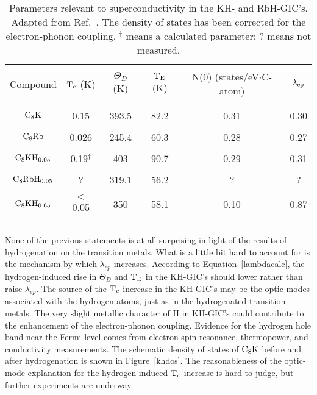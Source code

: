 \begin{table}
\begin{center}
\caption[Parameters rel\-e\-vant to su\-per\-con\-duct\-ivity in the KH- and
RbH-GIC's]{Parameters  relevant  to   superconductivity  in  the   KH-  and
RbH-GIC's.  Adapted  from Ref.~\cite{enoki85}.  The density of   states has
been  corrected  for the  electron-phonon   coupling.  $^{\dagger}$ means a
calculated parameter; ? means not measured.}
\vspace{0.5in}
\label{khcvtable}
\begin{tabular}{|c|ccccc|}
\hline
& & & & & \\
Compound & $\rm T_c$ (K) & $\Theta_D$ (K) & $\rm T_E$ (K) & N(0)
(states/eV$\cdot$C-atom) & $\rm \lambda_{ep}$\\
& & & & & \\
\hline
& & & & & \\
$\rm C_8K$ & 0.15 & 393.5& 82.2 & 0.31 & 0.30 \\
& & & & & \\
$\rm C_8Rb$  & 0.026 & 245.4 & 60.3 & 0.28 & 0.27 \\
& & & & & \\
$\rm C_8KH_{0.05}$ & 0.19$^{\dagger}$ & 403& 90.7 & 0.29 & 0.31 \\
& & & & & \\
$\rm C_8RbH_{0.05}$ & ? & 319.1 & 56.2 & ? & ? \\
& & & & & \\
$\rm C_8KH_{0.65}$  & $<$0.05 & 350& 58.1 & 0.10 & 0.87\\
& & & & & \\
& & & & & \\
\hline
\end{tabular}
\end{center}
\end{table}

        None of the previous statements is  at  all surprising in  light of
the results  of hydrogenation  on the  transition metals.  What is a little
bit hard to account for is the mechanism by which $\lambda_{ep}$ increases.
According   to  Equation~\ref{lambdacalc},  the   hydrogen-induced rise  in
$\Theta_D$  and $\rm T_E$ in the  KH-GIC's should  lower rather than  raise
$\lambda_{ep}$.  The source of the $\rm  T_c$ increase in  the KH-GIC's may
be the  optic  modes associated with  the  hydrogen atoms, just   as in the
hydrogenated   transition metals.\cite{enoki88}   The  very slight metallic
character of H in KH-GIC's\cite{miyajima88,enoki87} could contribute to the
enhancement of the   electron-phonon coupling.  Evidence  for the  hydrogen
hole band near   the  Fermi level comes from   electron   spin   resonance,
thermopower, and conductivity  measurements.\cite{miyajima88,enoki87}   The
schematic density of states of $\rm C_8K$ before and after hydrogenation is
shown  in   Figure~\ref{khdos}.   The  reasonableness  of   the  optic-mode
explanation for the hydrogen-induced $\rm T_c$ increase is  hard to judge,
but further experiments are underway.


